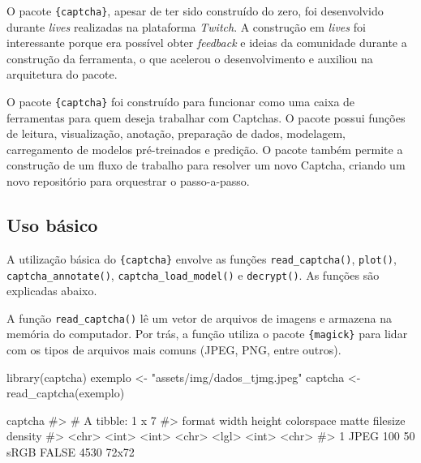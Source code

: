 \documentclass[12pt,twoside,brazilian]{book}
\newenvironment{Shaded}{\begin{snugshade}}{\end{snugshade}}
\newcommand{\CommentTok}[1]{\textcolor[rgb]{0.37,0.37,0.37}{#1}}
\newcommand{\FunctionTok}[1]{\textcolor[rgb]{0.28,0.35,0.67}{#1}}
\newcommand{\NormalTok}[1]{\textcolor[rgb]{0.00,0.23,0.31}{#1}}
\newcommand{\OtherTok}[1]{\textcolor[rgb]{0.00,0.23,0.31}{#1}}
\newcommand{\StringTok}[1]{\textcolor[rgb]{0.13,0.47,0.30}{#1}}
\begin{document}
O pacote \texttt{\{captcha\}}, apesar de ter sido construído do zero,
foi desenvolvido durante \emph{lives} realizadas na plataforma
\emph{Twitch}. A construção em \emph{lives} foi interessante porque era
possível obter \emph{feedback} e ideias da comunidade durante a
construção da ferramenta, o que acelerou o desenvolvimento e auxiliou na
arquitetura do pacote.

O pacote \texttt{\{captcha\}} foi construído para funcionar como uma
caixa de ferramentas para quem deseja trabalhar com Captchas. O pacote
possui funções de leitura, visualização, anotação, preparação de dados,
modelagem, carregamento de modelos pré-treinados e predição. O pacote
também permite a construção de um fluxo de trabalho para resolver um
novo Captcha, criando um novo repositório para orquestrar o
passo-a-passo.

\hypertarget{uso-buxe1sico}{%
\subsection{Uso básico}\label{uso-buxe1sico}}

A utilização básica do \texttt{\{captcha\}} envolve as funções
\texttt{read\_captcha()}, \texttt{plot()}, \texttt{captcha\_annotate()},
\texttt{captcha\_load\_model()} e \texttt{decrypt()}. As funções são
explicadas abaixo.

A função \texttt{read\_captcha()} lê um vetor de arquivos de imagens e
armazena na memória do computador. Por trás, a função utiliza o pacote
\texttt{\{magick\}} para lidar com os tipos de arquivos mais comuns
(JPEG, PNG, entre outros).

\begin{Shaded}
\begin{Highlighting}[]
\FunctionTok{library}\NormalTok{(captcha)}
\NormalTok{exemplo }\OtherTok{\textless{}{-}} \StringTok{"assets/img/dados\_tjmg.jpeg"}
\NormalTok{captcha }\OtherTok{\textless{}{-}} \FunctionTok{read\_captcha}\NormalTok{(exemplo)}

\NormalTok{captcha}
\CommentTok{\#\textgreater{} \# A tibble: 1 x 7}
\CommentTok{\#\textgreater{}   format width height colorspace matte filesize density}
\CommentTok{\#\textgreater{}   \textless{}chr\textgreater{}  \textless{}int\textgreater{}  \textless{}int\textgreater{} \textless{}chr\textgreater{}      \textless{}lgl\textgreater{}    \textless{}int\textgreater{} \textless{}chr\textgreater{}  }
\CommentTok{\#\textgreater{} 1 JPEG     100     50 sRGB       FALSE     4530 72x72}
\end{Highlighting}
\end{Shaded}
\end{document}
